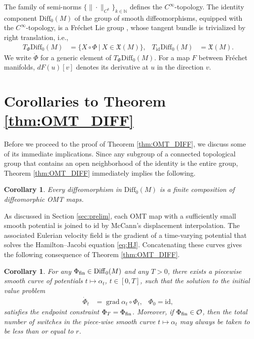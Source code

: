 \documentclass{article}
\newtheorem{corollary}[theorem]{Corollary}
\theoremstyle{remark}
\newcommand{\M}{M}
\newcommand{\X}{\mathfrak{X}(\M)}
\newcommand{\Diff}{\mathrm{Diff}_0(\M)}
\DeclareMathOperator{\grad}{\mathrm{grad}}
\begin{document}
%
The family of semi-norms $\{\|\cdot\|_{C^k}\}_{k\in\mathbb{N}}$ defines the $C^\infty$-topology. The identity component $\Diff$ of the group of smooth diffeomorphisms, equipped with the $C^\infty$-topology, is a Fr\'echet Lie group \cite[Part~I, Section 4]{Hamilton1982}, whose tangent bundle is trivialized by right translation, i.e.,
%
\begin{align*}
    T_{\Phi}\Diff&=\{X\circ\Phi~|~X\in\X\}, & T_{\mathrm{id}}\Diff&=\X.
\end{align*}
%
We write $\dot{\Phi}$ for a generic element of $T_\Phi\Diff$. For a map $F$ between Fr\'echet manifolds, $dF(u)[v]$ denotes its derivative at $u$ in the direction $v$.
\section{Corollaries to Theorem \ref{thm:OMT_DIFF}}\label{sec:corollaries}
%
Before we proceed to the proof of Theorem \ref{thm:OMT_DIFF}, we discuss some of its immediate implications. 
%
Since any subgroup of a connected topological group that contains an open neighborhood of the identity is the entire group, Theorem \ref{thm:OMT_DIFF} immediately implies the following.
%

%
\begin{corollary}
    Every diffeomorphism in $\Diff$ is a finite composition of diffeomorphic OMT maps.
\end{corollary}
%

%
As discussed in Section \ref{sec:prelim}, each OMT map with a sufficiently small smooth potential is joined to $\mathrm{id}$ by McCann's displacement interpolation. The associated Eulerian velocity field is the gradient of a time-varying potential that solves the Hamilton--Jacobi equation \eqref{eq:HJ}. Concatenating these curves gives the following consequence of Theorem \ref{thm:OMT_DIFF}.
%

%
\begin{corollary}\label{cor:controllability}
%
For any $\Phi_{\rm fin}\in\Diff$ and any $T>0$, there exists a piecewise smooth curve of potentials $t\mapsto\alpha_t$, $t\in[0,T]$, such that the solution to the initial value problem
    \begin{align}\label{eq:controlsystem}
        \dot{\Phi}_t &= \grad\alpha_{t} \circ \Phi_t, & \Phi_0=\mathrm{id},
    \end{align}
    satisfies the endpoint constraint $\Phi_T= \Phi_{\rm fin}$. Moreover, if $\Phi_{\rm fin}\in\mathcal{O}$, then the total number of switches in the piece-wise smooth curve $t\mapsto\alpha_t$ may always be taken to be less than or equal to $r$.
\end{corollary}
%
\end{document}

